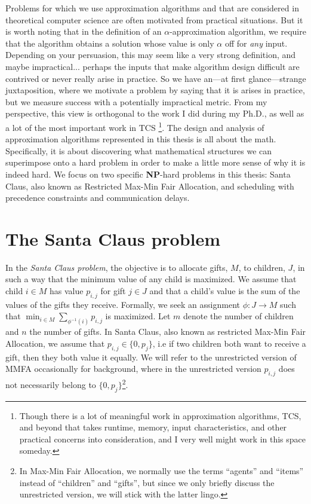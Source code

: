 Problems for which we use approximation algorithms and that are considered in theoretical computer science 
are often motivated from practical situations. 
But it is worth noting that in the definition of an $\alpha$-approximation algorithm, 
we require that the algorithm obtains a solution whose value is only $\alpha$ off for \emph{any} input.
Depending on your persuasion, this may seem like a very strong definition, and maybe impractical... 
perhaps the inputs that make algorithm design difficult are contrived or never really arise in practice. 
So we have an---at first glance---strange juxtaposition, where we motivate a problem by saying that it is arises in practice,
but we measure success with a potentially impractical metric.
From my perspective, this view is orthogonal to the work I did during my Ph.D., as well as a lot of the most important work in TCS
\footnote{Though there is a lot of meaningful work in approximation algorithms, TCS, and beyond that 
takes runtime, memory, input characteristics, and other practical concerns into consideration, and I very well might work in this space someday.}.
The design and analysis of approximation algorithms represented in this thesis is all about the math.
Specifically, it is about discovering what mathematical structures we can superimpose onto a hard problem in order to make a little more sense 
of why it is indeed hard. 
We focus on two specific \textbf{NP}-hard problems in this thesis: Santa Claus, also known as Restricted Max-Min Fair Allocation, and scheduling 
with precedence constraints and communication delays.





\bigskip



\section{The Santa Claus problem}

In the \emph{Santa Claus problem}, the objective is to allocate gifts, $M$, to children, $J$, in such a way that the minimum value of any child is maximized. 
We assume that child $i \in M$ has value $p_{i,j}$ for gift $j \in J$ and that a child's value is the sum of the values of the gifts they receive. 
Formally, we seek an assignment $\phi: J \rightarrow M$ such that $\min_{i \in M} \sum_{\phi^{-1}(i)} p_{i,j}$ is maximized. 
Let $m$ denote the number of children and $n$ the number of gifts. 
In Santa Claus, also known as restricted Max-Min Fair Allocation, we assume that $p_{i,j} \in \{0,p_j\}$, i.e if two children both want to receive a gift, then they both value it equally.
We will refer to the unrestricted version of MMFA occasionally for background, 
where in the unrestricted version $p_{i,j}$ does not necessarily belong to $\{0,p_j\}$\footnote{In Max-Min Fair Allocation,
 we normally use the terms ``agents'' and ``items'' instead of ``children'' and ``gifts'', 
 but since we only briefly discuss the unrestricted version, we will stick with the latter lingo.}.

